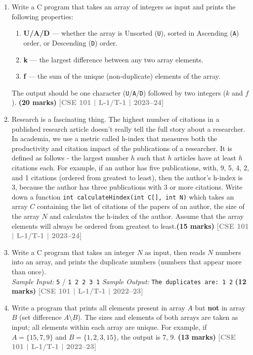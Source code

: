 \documentclass[12pt,a3paper]{article}
\newcommand{\yr}[1]{\hfill\textcolor{gray}{\small\textbf{[#1]}}}
\newcommand{\mk}[1]{\textcolor{orange!70!black}{\small\textbf{(#1 marks)}}}
\begin{document}
\begin{enumerate}
\item Write a C program that takes an array of integers as input and prints the following properties:
\begin{enumerate}
  \item \textbf{U/A/D} --- whether the array is Unsorted (\texttt{U}), sorted in Ascending (\texttt{A}) order, or Descending (\texttt{D}) order.
  \item \textbf{k} --- the largest difference between any two array elements.
  \item \textbf{f} --- the sum of the unique (non-duplicate) elements of the array.
\end{enumerate}
The output should be one character (\texttt{U}/\texttt{A}/\texttt{D}) followed by two integers ($k$ and $f$).
\mk{20} \yr{CSE 101 | L-1/T-1 | 2023--24}

\item Research is a fascinating thing. The highest number of citations in a published
    research article doesn't really tell the full story about a researcher. In academia, we use a
    metric called h-index that measures both the productivity and citation impact of the
    publications of a researcher. It is defined as follows - the largest number $h$ such that $h$
    articles have at least $h$ citations each. For example, if an author has five publications,
    with, 9, 5, 4, 2, and 1 citations (ordered from greatest to least), then the author's h-index
    is 3, because the author has three publications with 3 or more citations. Write down a
    function \texttt{int calculateHindex(int C[], int N)} which takes an array $C$ containing the list of
    citations of the papers of an author, the size of the array $N$ and calculates the h-index of
    the author. Assume that the array elements will always be ordered from greatest to least.\mk{15} \yr{CSE 101 | L-1/T-1 | 2023--24}

\item Write a C program that takes an integer $N$ as input, then reads $N$ numbers into an array, and prints the duplicate numbers (numbers that appear more than once).\\
\textit{Sample Input:} \texttt{5} / \texttt{1 2 2 3 1} \quad \textit{Sample Output:} \texttt{The duplicates are: 1 2}
\mk{12} \yr{CSE 101 | L-1/T-1 | 2022--23}

\item Write a program that prints all elements present in array $A$ but \textbf{not} in array $B$ (set difference $A \setminus B$). The sizes and elements of both arrays are taken as input; all elements within each array are unique. For example, if $A = \{15, 7, 9\}$ and $B = \{1, 2, 3, 15\}$, the output is 7, 9.
\mk{13} \yr{CSE 101 | L-1/T-1 | 2022--23}


\end{enumerate}
\end{document}
